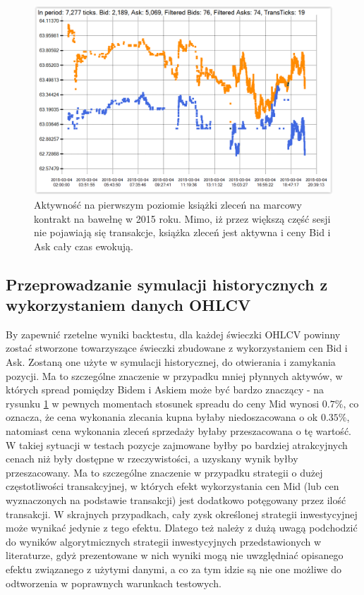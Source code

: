 \documentclass[a4paper,12pt,openany, DIV=calc, headsepline]{scrbook}
\begin{document}
\begin{figure}[H]
  \centering
  \includegraphics[scale=0.5]{wykresy/cottonOrderH.PNG}
  \caption{Aktywność na pierwszym poziomie książki zleceń na marcowy kontrakt na bawełnę w 2015 roku. Mimo, iż przez większą część sesji nie pojawiają się transakcje, książka zleceń jest aktywna i ceny Bid i Ask cały czas ewokują.}
  \label{fig:cottonOrder}
\end{figure}

\subsection{Przeprowadzanie symulacji historycznych z wykorzystaniem danych OHLCV}


By zapewnić rzetelne wyniki backtestu, dla każdej świeczki OHLCV powinny zostać stworzone towarzyszące świeczki zbudowane z wykorzystaniem cen Bid i Ask. Zostaną one użyte w symulacji historycznej, do otwierania i zamykania pozycji. Ma to szczególne znaczenie w przypadku mniej płynnych aktywów, w których spread pomiędzy Bidem i Askiem może być bardzo znaczący - na rysunku \ref{fig:cottonOrder} w pewnych momentach stosunek spreadu do ceny Mid wynosi $0.7\%$, co oznacza, że cena wykonania zlecania kupna byłaby niedoszacowana o ok $0.35\%$, natomiast cena wykonania zleceń sprzedaży byłaby przeszacowana o tę wartość. W takiej sytuacji w testach pozycje zajmowane byłby po bardziej atrakcyjnych cenach niż były dostępne w rzeczywistości, a uzyskany wynik byłby przeszacowany. Ma to szczególne znaczenie w przypadku strategii o dużej częstotliwości transakcyjnej, w których efekt wykorzystania cen Mid (lub cen wyznaczonych na podstawie transakcji) jest dodatkowo potęgowany przez ilość transakcji. W skrajnych przypadkach, cały zysk określonej strategii inwestycyjnej może wynikać jedynie z tego efektu. Dlatego też należy z dużą uwagą podchodzić do wyników algorytmicznych strategii inwestycyjnych przedstawionych w literaturze, gdyż prezentowane w nich wyniki mogą nie uwzględniać opisanego efektu związanego z użytymi danymi, a co za tym idzie są nie one możliwe do odtworzenia w poprawnych warunkach testowych. 
\end{document}
